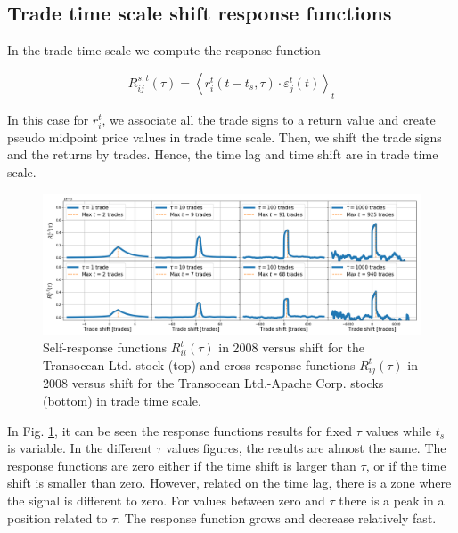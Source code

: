 \subsection{Trade time scale shift response functions}
\label{subsec:time_shift_trade}

In the trade time scale we compute the response function

\begin{equation}\label{eq:time_shift_trade}
    R_{ij}^{s, t}\left(\tau\right)=\left\langle r^{t}_{i}
    \left(t-t_{s},\tau\right) \cdot\varepsilon^{t}_{j}
    \left(t\right)\right\rangle _{t}
\end{equation}

In this case for $r^{t}_{i}$, we associate all the trade signs to a return
value and create pseudo midpoint price values in trade time scale. Then, we
shift the trade signs and the returns by trades. Hence, the time lag and time
shift are in trade time scale.

\begin{figure}[htbp]
    \centering
    \includegraphics[width=\textwidth]{figures/04_shift_trade_RIG_APA.png}
    \caption{Self-response functions $R_{ii}^{t}\left(\tau\right)$ in 2008
             versus shift for the Transocean Ltd. stock (top) and
             cross-response functions $R_{ij}^{t}\left(\tau\right)$ in 2008
             versus shift for the Transocean Ltd.-Apache Corp. stocks (bottom)
             in trade time scale.}
    \label{fig:shift_trade_scale}
\end{figure}

In Fig. \ref{fig:shift_trade_scale}, it can be seen the response functions
results for fixed $\tau$ values while $t_{s}$ is variable. In the different
$\tau$ values figures, the results are almost the same. The response functions
are zero either if the time shift is larger than $\tau$, or if the time shift
is smaller than zero. However, related on the time lag, there is a zone where
the signal is different to zero. For values between zero and $\tau$ there is a
peak in a position related to $\tau$. The response function grows and decrease
relatively fast.

